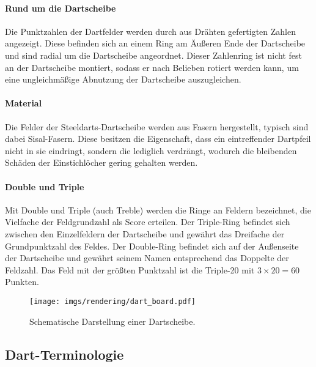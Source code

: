 \paragraph{Rund um die Dartscheibe}

Die Punktzahlen der Dartfelder werden durch aus Drähten gefertigten Zahlen angezeigt. Diese befinden sich an einem Ring am Äußeren Ende der Dartscheibe und sind radial um die Dartscheibe angeordnet. Dieser Zahlenring ist nicht fest an der Dartscheibe montiert, sodass er nach Belieben rotiert werden kann, um eine ungleichmäßige Abnutzung der Dartscheibe auszugleichen.

\paragraph{Material}

Die Felder der Steeldarts-Dartscheibe werden aus Fasern hergestellt, typisch sind dabei Sisal-Fasern. Diese besitzen die Eigenschaft, dass ein eintreffender Dartpfeil nicht in sie eindringt, sondern die lediglich verdrängt, wodurch die bleibenden Schäden der Einstichlöcher gering gehalten werden.

\paragraph{Double und Triple}

Mit Double und Triple (auch Treble) werden die Ringe an Feldern bezeichnet, die Vielfache der Feldgrundzahl als Score erteilen. Der Triple-Ring befindet sich zwischen den Einzelfeldern der Dartscheibe und gewährt das Dreifache der Grundpunktzahl des Feldes. Der Double-Ring befindet sich auf der Außenseite der Dartscheibe und gewährt seinem Namen entsprechend das Doppelte der Feldzahl. Das Feld mit der größten Punktzahl ist die Triple-20 mit $3 \times 20 = 60$ Punkten.

\begin{figure}
    \centering
    \texttt{[image: imgs/rendering/dart\_board.pdf]}
    \caption{Schematische Darstellung einer Dartscheibe.}
    \label{img:dart_board}
\end{figure}



\subsection{Dart-Terminologie}
\label{sec:dart_terminologie}

